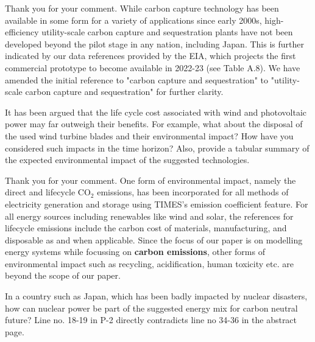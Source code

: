 \documentclass[answers,11pt]{exam}
\begin{document}
\begin{questions}
        \begin{solution}
                 Thank you for your comment. While carbon capture technology has been available in some form for a variety of applications since early 2000s, high-efficiency utility-scale carbon capture and sequestration plants have not been developed beyond the pilot stage in any nation, including Japan. This is further indicated by our data references provided by the EIA, which projects the first commercial prototype to become available in 2022-23 (see Table A.8). We have amended the initial reference to "carbon capture and sequestration" to "utility-scale carbon capture and sequestration" for further clarity.
                 
                 
        \end{solution}
        
      
                        \question It has been argued that the life cycle cost associated with wind and photovoltaic power may far outweigh  their benefits. For example, what about the disposal of the used wind turbine blades and their environmental impact? How have you considered such impacts in the time horizon? Also, provide a tabular summary of the expected environmental impact of the suggested technologies. 
        
        \begin{solution}
        
                 Thank you for your comment. One form of environmental impact, namely the direct and lifecycle CO$_2$ emissions, has been incorporated for all methods of electricity generation and storage using TIMES's emission coefficient feature. For all energy sources including renewables like wind and solar, the references for lifecycle emissions include the carbon cost of materials, manufacturing, and disposable as and when applicable. Since the focus of our paper is on modelling energy systems while focussing on \textbf{carbon emissions}, other forms of environmental impact such as recycling, acidification, human toxicity etc. are beyond the scope of our paper.
                 
                 
        \end{solution}

                        \question In a country such as Japan, which has been badly impacted by nuclear disasters, how can nuclear power be part of the suggested energy mix for carbon neutral future? Line no. 18-19 in P-2 directly contradicts line no 34-36 in the abstract page.
        

\end{questions}
\end{document}
